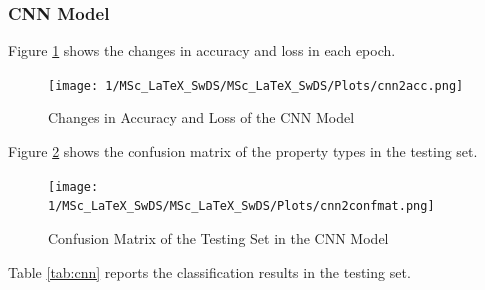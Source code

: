 \documentclass[11pt,twoside]{article}
\numberwithin{Theorem}{section}
\numberwithin{Definition}{section}
\numberwithin{Lemma}{section}
\numberwithin{Algorithm}{section}
\numberwithin{equation}{section}
\begin{document}
\subsubsection{CNN Model}

Figure \ref{fig:cnnacc} shows the changes in accuracy and loss in each epoch.

\begin{figure}[h]
\centering
\texttt{[image: 1/MSc\_LaTeX\_SwDS/MSc\_LaTeX\_SwDS/Plots/cnn2acc.png]}
\caption{Changes in Accuracy and Loss of the CNN Model}
\label{fig:cnnacc}
\end{figure}

\newpage

Figure \ref{fig:cnnconf} shows  the confusion matrix of the property types in the testing set.

\begin{figure}[h]
\centering
\texttt{[image: 1/MSc\_LaTeX\_SwDS/MSc\_LaTeX\_SwDS/Plots/cnn2confmat.png]}
\caption{Confusion Matrix of the Testing Set in the CNN Model}
\label{fig:cnnconf}
\end{figure}

\newpage
Table \ref{tab:cnn} reports the classification results in the testing set.

\begin{table}[h]
\centering
{}

\caption{Classification Report of the CNN Model}
\label{tab:cnn}

\end{table}
\end{document}
